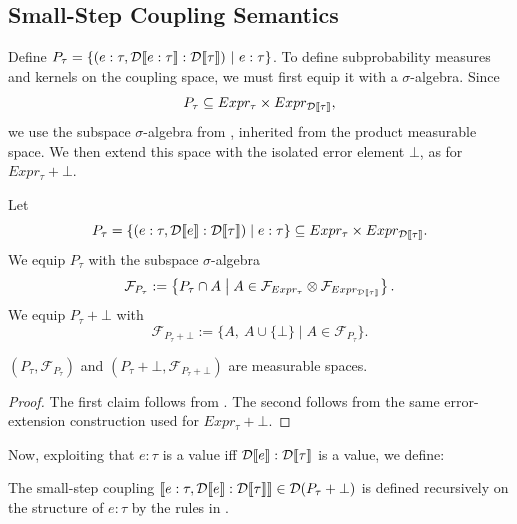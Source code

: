 \subsection{Small-Step Coupling Semantics}


Define $P_\tau = \{ (e:\tau, \mathcal{D}\llbracket e:\tau \rrbracket : \mathcal{D}\llbracket \tau \rrbracket) ~|~ e:\tau \}$. To define subprobability measures and kernels on the coupling space, we
must first equip it with a $\sigma$-algebra. Since
\[
P_\tau\subseteq Expr_\tau\times Expr_{\mathcal{D}\llbracket \tau \rrbracket},
\]
we use the subspace $\sigma$-algebra from
, inherited from the product measurable
space. We then extend this space with the isolated error element
$\bot$, as for $Expr_\tau+\bot$.


\begin{definition}
Let
\[
	P_\tau
	=
	\{(e:\tau,\mathcal{D}\llbracket e \rrbracket:\mathcal{D}\llbracket \tau \rrbracket)\mid e:\tau\}
	\subseteq
	Expr_\tau\times Expr_{\mathcal{D}\llbracket \tau \rrbracket}.
\]
We equip $P_\tau$ with the subspace $\sigma$-algebra
\[
	\mathcal F_{P_\tau}
	:=
	\left\{
	P_\tau\cap A
	\;\middle|\;
	A\in
	\mathcal F_{Expr_\tau}
	\otimes
	\mathcal F_{Expr_{\mathcal{D}\llbracket \tau \rrbracket}}
	\right\}.
\]
We equip $P_\tau+\bot$ with
\[
	\mathcal F_{P_\tau+\bot}
	:=
	\{A,\ A\cup\{\bot\}\mid A\in\mathcal F_{P_\tau}\}.
\]
\end{definition}

\begin{lemma}\label{lem:measurable-coupling-space}
	$(P_\tau,\mathcal F_{P_\tau})$
	and $(P_\tau+\bot,\mathcal F_{P_\tau+\bot})$
	are measurable spaces.
\end{lemma}

\begin{proof}
	The first claim follows from
	. The second follows from the same
	error-extension construction used for \(Expr_\tau+\bot\).
\end{proof}

Now, exploiting that $e:\tau$ is a value iff $\mathcal{D}\llbracket e \rrbracket : \mathcal{D}\llbracket \tau \rrbracket$ is a value, we define:
%
\begin{definition}
	The small-step coupling  $\llbracket e :\tau, \mathcal{D}\llbracket e \rrbracket: \mathcal{D}\llbracket \tau \rrbracket \rrbracket \in \mathcal{D}(P_{\tau} + \bot)$ is defined recursively on the structure of $e:\tau$ by the rules in . 
\end{definition}
%
%

